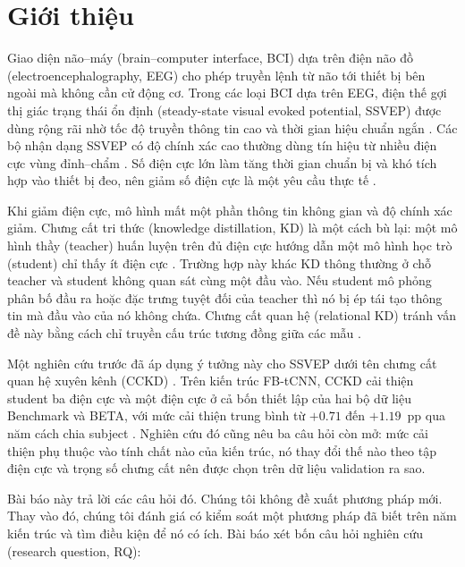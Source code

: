 \documentclass[10pt]{article} %
\begin{document}
\section{Giới thiệu}
\label{sec:introduction}

Giao diện não--máy (brain--computer interface, BCI) dựa trên điện não đồ (electroencephalography, EEG) cho phép truyền lệnh từ não tới thiết bị bên ngoài mà không cần cử động cơ. Trong các loại BCI dựa trên EEG, điện thế gợi thị giác trạng thái ổn định (steady-state visual evoked potential, SSVEP) được dùng rộng rãi nhờ tốc độ truyền thông tin cao và thời gian hiệu chuẩn ngắn \citep{chen2015highspeed,zhang2023wearable}. Các bộ nhận dạng SSVEP có độ chính xác cao thường dùng tín hiệu từ nhiều điện cực vùng đỉnh--chẩm \citep{wang2017benchmark,liu2020beta}. Số điện cực lớn làm tăng thời gian chuẩn bị và khó tích hợp vào thiết bị đeo, nên giảm số điện cực là một yêu cầu thực tế \citep{zhang2023wearable,zhu2021open,acampora2021dataset}.

Khi giảm điện cực, mô hình mất một phần thông tin không gian và độ chính xác giảm. Chưng cất tri thức (knowledge distillation, KD) là một cách bù lại: một mô hình thầy (teacher) huấn luyện trên đủ điện cực hướng dẫn một mô hình học trò (student) chỉ thấy ít điện cực \citep{hinton2015distilling,gou2021survey}. Trường hợp này khác KD thông thường ở chỗ teacher và student không quan sát cùng một đầu vào. Nếu student mô phỏng phân bố đầu ra hoặc đặc trưng tuyệt đối của teacher thì nó bị ép tái tạo thông tin mà đầu vào của nó không chứa. Chưng cất quan hệ (relational KD) tránh vấn đề này bằng cách chỉ truyền cấu trúc tương đồng giữa các mẫu \citep{tung2019spkd}.

Một nghiên cứu trước đã áp dụng ý tưởng này cho SSVEP dưới tên chưng cất quan hệ xuyên kênh (CCKD) \citep{icera2026cckd}. Trên kiến trúc FB-tCNN, CCKD cải thiện student ba điện cực và một điện cực ở cả bốn thiết lập của hai bộ dữ liệu Benchmark và BETA, với mức cải thiện trung bình từ $+0.71$ đến $+1.19$~pp qua năm cách chia subject \citep{icera2026cckd}. Nghiên cứu đó cũng nêu ba câu hỏi còn mở: mức cải thiện phụ thuộc vào tính chất nào của kiến trúc, nó thay đổi thế nào theo tập điện cực và trọng số chưng cất nên được chọn trên dữ liệu validation ra sao.

Bài báo này trả lời các câu hỏi đó. Chúng tôi không đề xuất phương pháp mới. Thay vào đó, chúng tôi đánh giá có kiểm soát một phương pháp đã biết trên năm kiến trúc và tìm điều kiện để nó có ích. Bài báo xét bốn câu hỏi nghiên cứu (research question, RQ):
\end{document}
